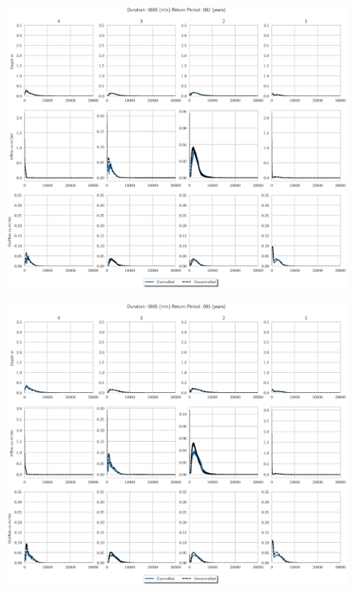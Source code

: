 \begin{figure}
    \centering
    \includegraphics[width=\linewidth]{./RL-SI-figures/77storms/0005002.eps}
\end{figure}
\begin{figure}
    \centering
    \includegraphics[width=\linewidth]{./RL-SI-figures/77storms/0005005.eps}
\end{figure}
